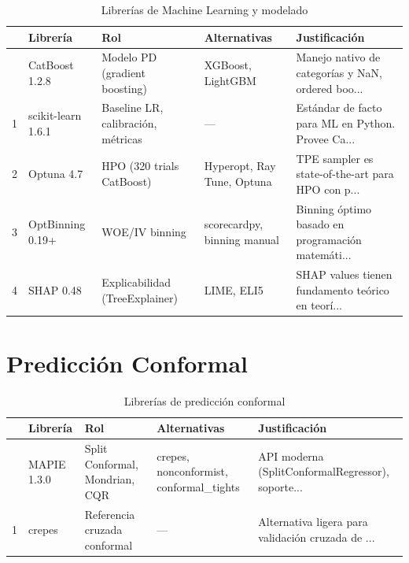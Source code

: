 \documentclass[
  spanish,
  11pt,
  letterpaper,
]{scrbook}
\theoremstyle{plain}
\theoremstyle{remark}
\begin{document}
{

\begin{longtable}[]{@{}lllll@{}}

\caption{\label{tbl-ml-stack}Librerías de Machine Learning y modelado}

\tabularnewline

\toprule\noalign{}
& Librería & Rol & Alternativas & Justificación \\
\midrule\noalign{}
\endhead
\bottomrule\noalign{}
\endlastfoot
0 & CatBoost 1.2.8 & Modelo PD (gradient boosting) & XGBoost, LightGBM &
Manejo nativo de categorías y NaN, ordered boo... \\
1 & scikit-learn 1.6.1 & Baseline LR, calibración, métricas & --- &
Estándar de facto para ML en Python. Provee Ca... \\
2 & Optuna 4.7 & HPO (320 trials CatBoost) & Hyperopt, Ray Tune, Optuna
& TPE sampler es state-of-the-art para HPO con p... \\
3 & OptBinning 0.19+ & WOE/IV binning & scorecardpy, binning manual &
Binning óptimo basado en programación matemáti... \\
4 & SHAP 0.48 & Explicabilidad (TreeExplainer) & LIME, ELI5 & SHAP
values tienen fundamento teórico en teorí... \\

\end{longtable}

}

\section{Predicción Conformal}\label{predicciuxf3n-conformal}

{

\begin{longtable}[]{@{}lllll@{}}

\caption{\label{tbl-conformal-stack}Librerías de predicción conformal}

\tabularnewline

\toprule\noalign{}
& Librería & Rol & Alternativas & Justificación \\
\midrule\noalign{}
\endhead
\bottomrule\noalign{}
\endlastfoot
0 & MAPIE 1.3.0 & Split Conformal, Mondrian, CQR & crepes,
nonconformist, conformal\_tights & API moderna
(SplitConformalRegressor), soporte... \\
1 & crepes & Referencia cruzada conformal & --- & Alternativa ligera
para validación cruzada de ... \\

\end{longtable}

}
\end{document}
